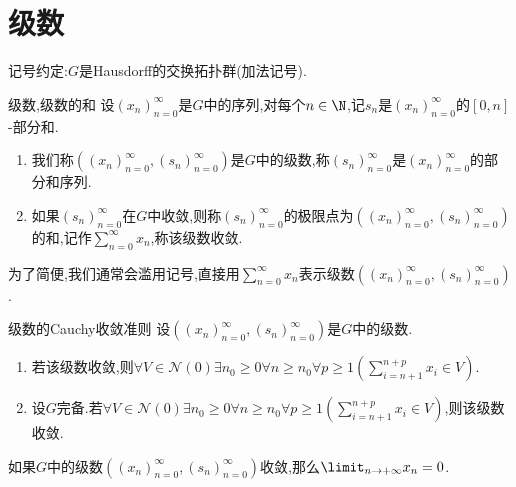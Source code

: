 \section{级数}

记号约定:$G$是Hausdorff的交换拓扑群(加法记号).

\begin{definition}{级数,级数的和}{}
	设$\left(x_{n}\right)_{n=0}^{\infty}$是$G$中的序列,对每个$n\in\N$,记$s_{n}$是$\left(x_{n}\right)_{n=0}^{\infty}$的$\left[0,n\right]$-部分和.
	\begin{enumerate}
		\item 我们称$\left(\left(x_{n}\right)_{n=0}^{\infty},\left(s_{n}\right)_{n=0}^{\infty}\right)$是$G$中的级数,称$\left(s_{n}\right)_{n=0}^{\infty}$是$\left(x_{n}\right)_{n=0}^{\infty}$的部分和序列.
		\item 如果$\left(s_{n}\right)_{n=0}^{\infty}$在$G$中收敛,则称$\left(s_{n}\right)_{n=0}^{\infty}$的极限点为$\left(\left(x_{n}\right)_{n=0}^{\infty},\left(s_{n}\right)_{n=0}^{\infty}\right)$的和,记作$\sum\limits_{n=0}^{\infty}x_{n}$,称该级数收敛.
	\end{enumerate}
\end{definition}

\begin{convention}{}{}
	为了简便,我们通常会滥用记号,直接用$\sum\limits_{n=0}^{\infty}x_{n}$表示级数$\left(\left(x_{n}\right)_{n=0}^{\infty},\left(s_{n}\right)_{n=0}^{\infty}\right)$.
\end{convention}

\begin{proposition}{级数的Cauchy收敛准则}{}
	设$\left(\left(x_{n}\right)_{n=0}^{\infty},\left(s_{n}\right)_{n=0}^{\infty}\right)$是$G$中的级数.
	\begin{enumerate}
		\item 若该级数收敛,则$\forall V\in\mathcal{N}\left(0\right)\exists n_{0}\geq 0\forall n\geq n_{0}\forall p\geq 1\left(\sum\limits_{i=n+1}^{n+p}x_{i}\in V\right)$.
		\item 设$G$完备.若$\forall V\in\mathcal{N}\left(0\right)\exists n_{0}\geq 0\forall n\geq n_{0}\forall p\geq 1\left(\sum\limits_{i=n+1}^{n+p}x_{i}\in V\right)$,则该级数收敛.
	\end{enumerate}
\end{proposition}

\begin{proposition}{}{}
	如果$G$中的级数$\left(\left(x_{n}\right)_{n=0}^{\infty},\left(s_{n}\right)_{n=0}^{\infty}\right)$收敛,那么$\limit_{n\to+\infty}x_{n}=0$.
\end{proposition}

